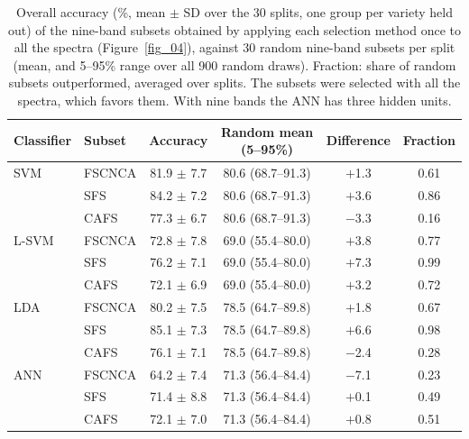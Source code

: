 \documentclass[final,5p,times,twocolumn]{elsarticle}
\newcommand{\added}[1]{#1}
\begin{document}
\begin{table}[htbp!]
    \centering
    \caption{\added{Overall accuracy (\%, mean $\pm$ SD over the 30 splits, one group per variety held out) of the nine-band subsets obtained by applying each selection method once to all the spectra (Figure~\ref{fig_04}), against 30 random nine-band subsets per split (mean, and 5--95\% range over all 900 random draws). Fraction: share of random subsets outperformed, averaged over splits. The subsets were selected with all the spectra, which favors them. With nine bands the ANN has three hidden units.}}
    \label{tab:sub9}
    \begin{tabular}{llcccc}
    \hline
    Classifier & Subset & Accuracy & Random mean (5--95\%) & Difference & Fraction \\
    \hline
    SVM   & FSCNCA & 81.9 $\pm$ 7.7 & 80.6 (68.7--91.3) & $+$1.3 & 0.61 \\
          & SFS    & 84.2 $\pm$ 7.2 & 80.6 (68.7--91.3) & $+$3.6 & 0.86 \\
          & CAFS   & 77.3 $\pm$ 6.7 & 80.6 (68.7--91.3) & $-$3.3 & 0.16 \\
    L-SVM & FSCNCA & 72.8 $\pm$ 7.8 & 69.0 (55.4--80.0) & $+$3.8 & 0.77 \\
          & SFS    & 76.2 $\pm$ 7.1 & 69.0 (55.4--80.0) & $+$7.3 & 0.99 \\
          & CAFS   & 72.1 $\pm$ 6.9 & 69.0 (55.4--80.0) & $+$3.2 & 0.72 \\
    LDA   & FSCNCA & 80.2 $\pm$ 7.5 & 78.5 (64.7--89.8) & $+$1.8 & 0.67 \\
          & SFS    & 85.1 $\pm$ 7.3 & 78.5 (64.7--89.8) & $+$6.6 & 0.98 \\
          & CAFS   & 76.1 $\pm$ 7.1 & 78.5 (64.7--89.8) & $-$2.4 & 0.28 \\
    ANN   & FSCNCA & 64.2 $\pm$ 7.4 & 71.3 (56.4--84.4) & $-$7.1 & 0.23 \\
          & SFS    & 71.4 $\pm$ 8.8 & 71.3 (56.4--84.4) & $+$0.1 & 0.49 \\
          & CAFS   & 72.1 $\pm$ 7.0 & 71.3 (56.4--84.4) & $+$0.8 & 0.51 \\
    \hline
    \end{tabular}
\end{table}
\end{document}
